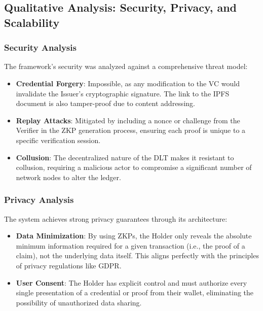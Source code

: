 \documentclass[conference]{IEEEtran}
\begin{document}
\subsection{Qualitative Analysis: Security, Privacy, and Scalability}

\subsubsection{Security Analysis}

The framework's security was analyzed against a comprehensive threat model:

\begin{itemize}
    \item \textbf{Credential Forgery}: Impossible, as any modification to the VC would invalidate the Issuer's cryptographic signature. The link to the IPFS document is also tamper-proof due to content addressing.
    
    \item \textbf{Replay Attacks}: Mitigated by including a nonce or challenge from the Verifier in the ZKP generation process, ensuring each proof is unique to a specific verification session.
    
    \item \textbf{Collusion}: The decentralized nature of the DLT makes it resistant to collusion, requiring a malicious actor to compromise a significant number of network nodes to alter the ledger.
\end{itemize}

\subsubsection{Privacy Analysis}

The system achieves strong privacy guarantees through its architecture:

\begin{itemize}
    \item \textbf{Data Minimization}: By using ZKPs, the Holder only reveals the absolute minimum information required for a given transaction (i.e., the proof of a claim), not the underlying data itself. This aligns perfectly with the principles of privacy regulations like GDPR.
    
    \item \textbf{User Consent}: The Holder has explicit control and must authorize every single presentation of a credential or proof from their wallet, eliminating the possibility of unauthorized data sharing.
\end{itemize}
\end{document}
